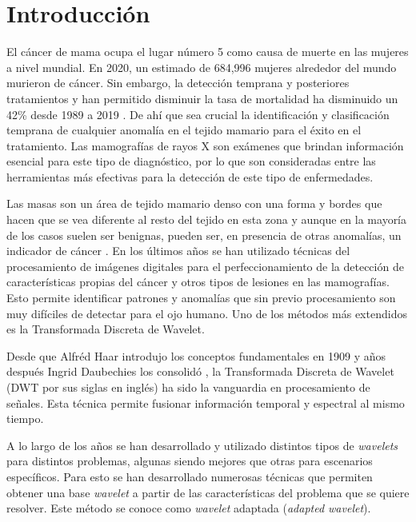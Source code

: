 \chapter*{Introducción}\label{chapter:introduction}

El cáncer de mama ocupa el lugar número 5 como causa de muerte en las mujeres a nivel
mundial. En 2020, un estimado de  684,996 mujeres alrededor del mundo murieron de
cáncer. Sin embargo, la detección temprana y posteriores tratamientos y 
han permitido disminuir
la tasa de mortalidad ha disminuido un 42\% desde 1989 a 2019\cite{breastcancer2020}
. De ahí que sea crucial la identificación y clasificación temprana de cualquier 
anomalía en el tejido mamario para el éxito en el tratamiento. Las mamografías de
rayos X son exámenes que brindan información esencial para este tipo de diagnóstico,
por lo que son consideradas entre las herramientas más efectivas 
para la detección de este tipo de enfermedades.

Las masas son un área de tejido mamario denso con una forma y bordes que hacen que se 
vea diferente al resto del tejido en esta zona y aunque en la mayoría de los casos
suelen ser benignas, pueden ser, en presencia de otras anomalías, un indicador 
de cáncer \cite{massbreast}.
En los últimos años se han utilizado técnicas del procesamiento de imágenes 
digitales para el perfeccionamiento de la detección de características propias
del cáncer y otros tipos de lesiones en las mamografías. 
Esto permite identificar patrones y anomalías que
sin previo procesamiento son muy difíciles de detectar para el ojo humano. 
Uno de los métodos más extendidos es la Transformada Discreta de Wavelet.

Desde que Alfréd Haar introdujo los conceptos fundamentales en 1909 \cite{haar} y años después
Ingrid Daubechies los consolidó \cite{daubechies1992}, la Transformada Discreta de Wavelet 
(DWT por sus siglas en inglés) ha sido la vanguardia en procesamiento de señales. Esta técnica 
permite fusionar información temporal y espectral al mismo tiempo. 

A lo largo de los
años se han desarrollado y utilizado distintos tipos de \textit{wavelets} para 
distintos problemas, algunas siendo mejores que otras para escenarios específicos. 
Para esto se han desarrollado numerosas técnicas que permiten obtener una base 
\textit{wavelet} a partir de las características del problema que se quiere
resolver. Este método se conoce como \textit{wavelet} 
adaptada (\textit{adapted wavelet}).

